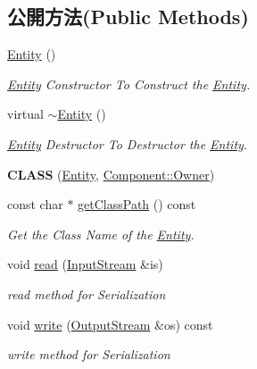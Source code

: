 \subsection*{公開方法(Public Methods)}
\begin{DoxyCompactItemize}
\item 
\hyperlink{class_magnum_1_1_entity_a980f368aa07ce358583982821533a54a}{Entity} ()\hypertarget{class_magnum_1_1_entity_a980f368aa07ce358583982821533a54a}{}\label{class_magnum_1_1_entity_a980f368aa07ce358583982821533a54a}

\begin{DoxyCompactList}\small\item\em \hyperlink{class_magnum_1_1_entity}{Entity} Constructor To Construct the \hyperlink{class_magnum_1_1_entity}{Entity}. \end{DoxyCompactList}\item 
virtual \hyperlink{class_magnum_1_1_entity_adf6d3f7cb1b2ba029b6b048a395cc8ae}{$\sim$\+Entity} ()\hypertarget{class_magnum_1_1_entity_adf6d3f7cb1b2ba029b6b048a395cc8ae}{}\label{class_magnum_1_1_entity_adf6d3f7cb1b2ba029b6b048a395cc8ae}

\begin{DoxyCompactList}\small\item\em \hyperlink{class_magnum_1_1_entity}{Entity} Destructor To Destructor the \hyperlink{class_magnum_1_1_entity}{Entity}. \end{DoxyCompactList}\item 
{\bfseries C\+L\+A\+SS} (\hyperlink{class_magnum_1_1_entity}{Entity}, \hyperlink{class_magnum_1_1_component_1_1_owner}{Component\+::\+Owner})\hypertarget{class_magnum_1_1_entity_aba3392e402c20094e9169aa7dbad5c70}{}\label{class_magnum_1_1_entity_aba3392e402c20094e9169aa7dbad5c70}

\item 
const char $\ast$ \hyperlink{class_magnum_1_1_entity_a47a29754f7e29daaaf069b287c2d76e7}{get\+Class\+Path} () const 
\begin{DoxyCompactList}\small\item\em Get the Class Name of the \hyperlink{class_magnum_1_1_entity}{Entity}. \end{DoxyCompactList}\item 
void \hyperlink{class_magnum_1_1_entity_a58873f05c2fca4c91c92924f9be753c9}{read} (\hyperlink{class_magnum_1_1_input_stream}{Input\+Stream} \&is)
\begin{DoxyCompactList}\small\item\em read method for Serialization \end{DoxyCompactList}\item 
void \hyperlink{class_magnum_1_1_entity_a10741436b8c23a174df4918577ad593c}{write} (\hyperlink{class_magnum_1_1_output_stream}{Output\+Stream} \&os) const 
\begin{DoxyCompactList}\small\item\em write method for Serialization \end{DoxyCompactList}\end{DoxyCompactItemize}
